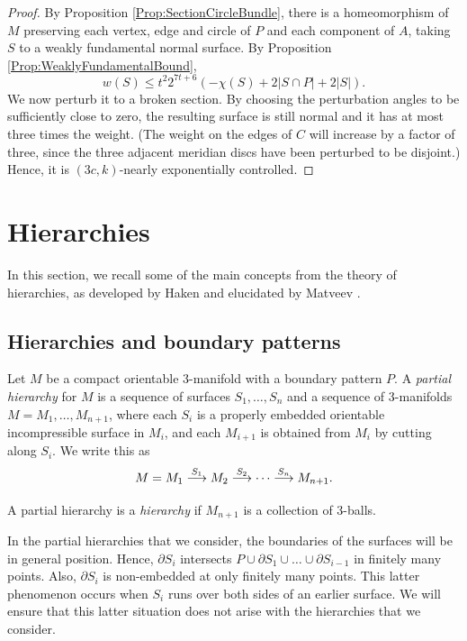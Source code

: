 \documentclass[oneside]{amsart}
\numberwithin{equation}{section}
\theoremstyle{plain}
\theoremstyle{definition}
\begin{document}
\begin{proof} 
By Proposition \ref{Prop:SectionCircleBundle},
there is a homeomorphism of $M$ preserving each vertex, edge and circle of $P$ and each component of $A$, 
taking $S$ to a weakly fundamental normal surface.
By Proposition \ref{Prop:WeaklyFundamentalBound},
$$w(S) \leq t^2 2^{7t+6} (-\chi(S) + 2 |S \cap P| + 2|S|).$$
We now perturb it to a broken section. By choosing the perturbation
angles to be sufficiently close to zero, the resulting surface is still normal and it has at most three times the weight.
(The weight on the edges of $C$ will increase by a factor of three, since the three adjacent meridian discs
have been perturbed to be disjoint.) Hence, it is $(3c,k)$-nearly exponentially
controlled.
\end{proof}

\section{Hierarchies}
\label{Sec:Hierarchies}

In this section, we recall some of the main concepts from the theory of hierarchies, as developed
by Haken \cite{Haken} and elucidated by Matveev \cite{Matveev}.


\subsection{Hierarchies and boundary patterns}


Let $M$ be a compact orientable 3-manifold with a boundary pattern $P$.
A \emph{partial hierarchy} for $M$ is a sequence of surfaces $S_1, \dots, S_{n}$ and
a sequence of 3-manifolds $M = M_1, \dots, M_{n+1}$, where each $S_i$ is a
properly embedded orientable incompressible surface in $M_i$, and each $M_{i+1}$ is obtained from $M_i$ by cutting along $S_i$. 
We write this as 
$$M = M_1 \buildrel S_1 \over \longrightarrow M_2 \buildrel S_2 \over \longrightarrow \dots
\buildrel S_{n} \over \longrightarrow M_{n+1}.$$

A partial hierarchy is a \emph{hierarchy} if $M_{n+1}$ is a collection of 3-balls. 

In the partial hierarchies that we consider, the boundaries of the surfaces will be 
in general position. Hence, $\partial S_i$ intersects $P \cup \partial S_1 \cup \dots \cup \partial S_{i-1}$
in finitely many points. Also, $\partial S_i$ is non-embedded at only finitely many points.
This latter phenomenon occurs when $S_i$ runs over both sides of an earlier surface. We will
ensure that this latter situation does not arise with the hierarchies that we consider.
\end{document}
